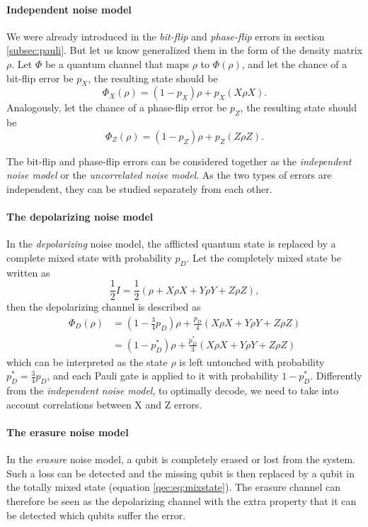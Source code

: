 \paragraph{Independent noise model}
We were already introduced in the \emph{bit-flip} and \emph{phase-flip} errors in section \ref{subsec:pauli}. But let us know generalized them in the form of the density matrix $\rho$. Let $\Phi$ be a quantum channel that maps $\rho$ to $\Phi(\rho)$, and let the chance of a bit-flip error be $p_X$, the resulting state should be
\begin{equation}\label{qec:eq:bitflip}
  \Phi_X(\rho) = (1-p_X)\rho + p_X(X\rho X).
\end{equation}
Analogously, let the chance of a phase-flip error be $p_Z$, the resulting state should be
\begin{equation}\label{qec:eq:phaseflip}
  \Phi_Z(\rho) = (1-p_Z)\rho + p_Z(Z\rho Z).
\end{equation}

The bit-flip and phase-flip errors can be considered together as the \emph{independent noise model} or the \emph{uncorrelated noise model}. As the two types of errors are independent, they can be studied separately from each other.

\paragraph{The depolarizing noise model}
In the \emph{depolarizing} noise model, the afflicted quantum state is replaced by a complete mixed state with probability $p_D$. Let the completely mixed state be written as
\begin{equation}\label{qec:eq:mixstate}
  \frac{1}{2}I = \frac{1}{2}(\rho + X\rho X + Y\rho Y + Z\rho Z),
\end{equation}
then the depolarizing channel is described as
\begin{align}\label{qec:eq:depolarizing}
  \Phi_D(\rho) &= (1-\frac{3}{4}p_D)\rho + \frac{p_D}{4}(X\rho X + Y\rho Y + Z\rho Z) \\
   &= (1-p^*_D)\rho + \frac{p^*_D}{3}(X\rho X + Y\rho Y + Z\rho Z)
\end{align}
which can be interpreted as the state $\rho$ is left untouched with probability $p^*_D =\frac{3}{4}p_D$, and each Pauli gate is applied to it with probability $1-p^*_D$. Differently from the \emph{independent noise model}, to optimally decode, we need to take into account correlations between X and Z errors.

\paragraph{The erasure noise model}
In the \emph{erasure} noise model, a qubit is completely erased or lost from the system. Such a loss can be detected and the missing qubit is then replaced by a qubit in the totally mixed state (equation \ref{qec:eq:mixstate}). The erasure channel can therefore be seen as the depolarizing channel with the extra property that it can be detected which qubits suffer the error.

